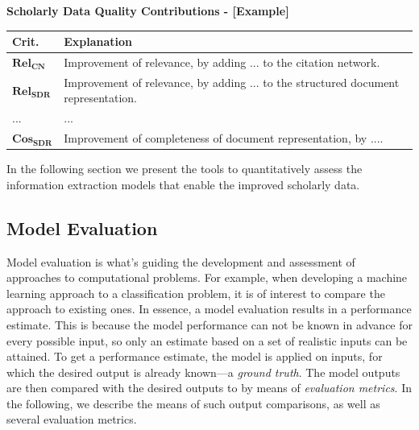 \begin{infobox-progress}
      \textbf{Scholarly Data Quality Contributions - [Example]}\vspace{0.5em}

      \begin{tabular}{lp{10.9cm}}
        \toprule
        Crit. & Explanation \\
        \midrule
        $\mathbf{Rel_{CN}}$ & Improvement of relevance, by adding ... to the citation network. \\
        $\mathbf{Rel_{SDR}}$ & Improvement of relevance, by adding ... to the structured document representation. \\
        ... & ... \\
        $\mathbf{Cos_{SDR}}$ & Improvement of completeness of document representation, by .... \\
        \bottomrule
      \end{tabular}

\end{infobox-progress}

In the following section we present the tools to quantitatively assess the information extraction models that enable the improved scholarly data.

\subsection{Model Evaluation}

Model evaluation is what's guiding the development and assessment of approaches to computational problems. For example, when developing a machine learning approach to a classification problem, it is of interest to compare the approach to existing ones. In essence, a model evaluation results in a performance estimate. This is because the model performance can not be known in advance for every possible input, so only an estimate based on a set of realistic inputs can be attained.
To get a performance estimate, the model is applied on inputs, for which the desired output is already known---a \emph{ground truth}. The model outputs are then compared with the desired outputs to by means of \emph{evaluation metrics}. In the following, we describe the means of such output comparisons, as well as several evaluation metrics.

